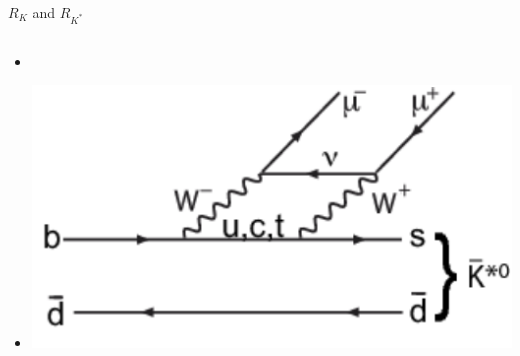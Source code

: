 \begin{frame}{$R_{K}$ and $R_{K^*}$}
\begin{columns}
\begin{column}{0.5\textwidth}
\begin{itemize}
                \item []
                \item []\includegraphics[scale=0.25]{content/feynman/png/BtoK2.png}
            \end{itemize}
        \end{column}
    \end{columns}
\end{frame}

